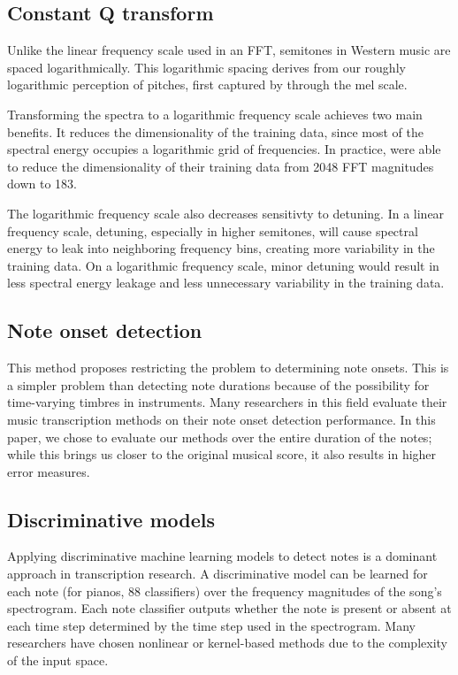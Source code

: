 \documentclass[5p]{elsarticle}
\begin{document}
\subsection{Constant Q transform}
Unlike the linear frequency scale used in an FFT, semitones in Western music are spaced logarithmically. This logarithmic spacing derives from our roughly logarithmic perception of pitches, first captured by \citet{stevens1937scale} through the mel scale.

Transforming the spectra to a logarithmic frequency scale achieves two main benefits. It reduces the dimensionality of the training data, since most of the spectral energy occupies a logarithmic grid of frequencies. In practice, \citet{bock2012polyphonic} were able to reduce the dimensionality of their training data from 2048 FFT magnitudes down to 183.

The logarithmic frequency scale also decreases sensitivty to detuning. In a linear frequency scale, detuning, especially in higher semitones, will cause spectral energy to leak into neighboring frequency bins, creating more variability in the training data. On a logarithmic frequency scale, minor detuning would result in less spectral energy leakage and less unnecessary variability in the training data.

\subsection{Note onset detection}
This method proposes restricting the problem to determining note onsets. This is a simpler problem than detecting note durations because of the possibility for time-varying timbres in instruments. Many researchers in this field evaluate their music transcription methods on their note onset detection performance. In this paper, we chose to evaluate our methods over the entire duration of the notes; while this brings us closer to the original musical score, it also results in higher error measures.

\subsection{Discriminative models}
Applying discriminative machine learning models to detect notes is a dominant approach in transcription research. A discriminative model can be learned for each note (for pianos, 88 classifiers) over the frequency magnitudes of the song's spectrogram. Each note classifier outputs whether the note is present or absent at each time step determined by the time step used in the spectrogram. Many researchers have chosen nonlinear or kernel-based methods due to the complexity of the input space.
\end{document}
